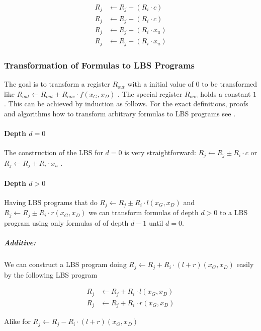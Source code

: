 \documentclass[12pt, a4paper]{article}
\begin{document}
\begin{align}
R_j & \leftarrow R_j + (R_i \cdot c) \\
R_j & \leftarrow R_j - (R_i \cdot c) \\
R_j & \leftarrow R_j + (R_i \cdot x_u) \\
R_j & \leftarrow R_j - (R_i \cdot x_u)
\end{align}


\subsubsection{Transformation of Formulas to LBS Programs}

The goal is to transform a register $R_{out}$ with a initial value of $0$ to be
transformed like $R_{out} \leftarrow R_{out} + R_{one} \cdot f(x_G,x_D)$ . The
special register $R_{one}$ holds a constant $1$. This can be achieved by
induction as follows.  For the exact definitions, proofs and algorithms how to
transform arbitrary formulas to LBS programs see \cite{cleve91}.


\paragraph{Depth $d = 0$}

The construction of the LBS for $d = 0$ is very straightforward:
$R_j \leftarrow R_j \pm R_i \cdot c$ or $R_j \leftarrow R_j \pm R_i \cdot x_u$ .


\paragraph{Depth $d > 0$}

Having LBS programs that do $R_j \leftarrow R_j \pm R_i \cdot l(x_G, x_D)$  and
$R_j \leftarrow R_j \pm R_i \cdot r(x_G, x_D)$ we can
transform formulas of depth $d > 0$ to a LBS program using only formulas of
of depth $d - 1$ until $d = 0$.

\subparagraph{Additive:} We can construct a LBS program doing $R_j \leftarrow
R_j + R_i \cdot (l + r)(x_G, x_D)$ easily by the following LBS program

\begin{align*}
R_j & \leftarrow R_j + R_i \cdot l(x_G, x_D) \\
R_j & \leftarrow R_j + R_i \cdot r(x_G, x_D)
\end{align*}

Alike for $R_j \leftarrow R_j - R_i \cdot (l + r)(x_G, x_D)$
\end{document}
